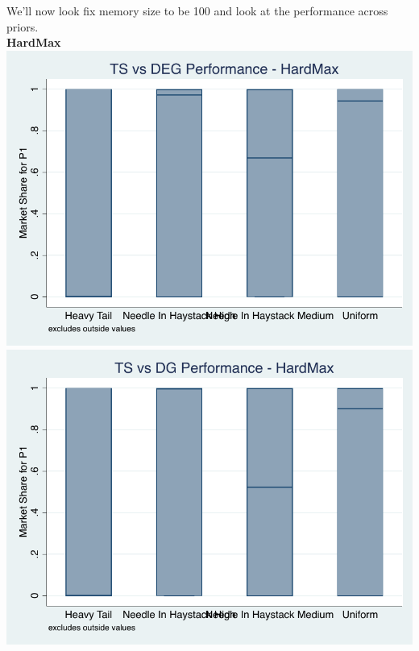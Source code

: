 \documentclass[11pt,letterpaper]{article}
\begin{document}
\pagebreak
We'll now look fix memory size to be 100 and look at the performance across priors.\\
\textbf{HardMax} \\
\includegraphics[scale=0.75]{hm_ts_deg_prior} \\
\includegraphics[scale=0.75]{hm_ts_dg_prior} \\
\end{document}
